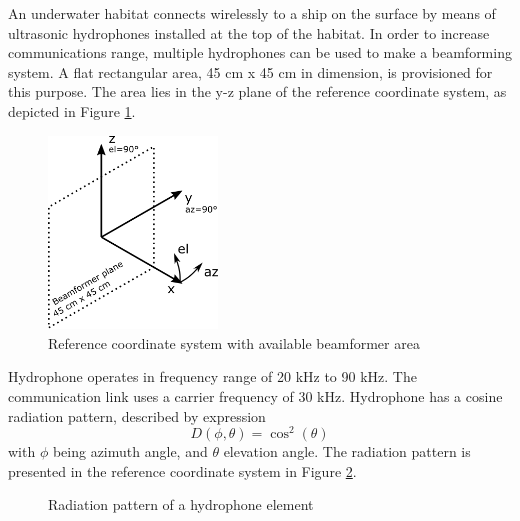 \documentclass[openany]{book}
\begin{document}
	An underwater habitat connects wirelessly to a ship on the surface by means 
	of 
	ultrasonic hydrophones installed at the top of the habitat. In order to 
	increase communications range, multiple hydrophones can be used to make a 
	beamforming system. A flat rectangular area, 45 cm x 45 cm in dimension, is 
	provisioned for this purpose. The area lies in the y-z plane of the 
	reference 
	coordinate system, as depicted in Figure \ref{fig:coord}.
	\begin{figure}[h!]
		\centering
		\includegraphics[width=0.4\textwidth]{coord.png}
		\caption{Reference coordinate system with available beamformer area}
		\label{fig:coord}
	\end{figure}
	
	Hydrophone operates in frequency range of 20 kHz to 90 kHz. The 
	communication 
	link uses a carrier frequency of 30 kHz. Hydrophone has a cosine radiation 
	pattern, described by expression
	\[ D(\phi,\theta) = \cos^2(\theta) \]
	with $\phi$ being azimuth angle, and $\theta$ elevation angle. The 
	radiation 
	pattern is presented in the reference coordinate system in Figure 
	\ref{fig:hydrophone}.
	\begin{figure}[h!]
		\centering
		\hfill
		\caption{Radiation pattern of a hydrophone element}
		\label{fig:hydrophone}
	\end{figure}
	
\end{document}
